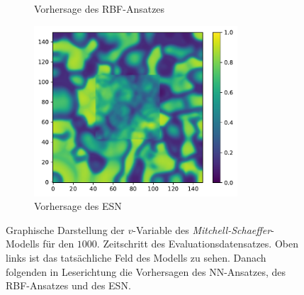 \begin{appendices}
\begin{figure}[h]
\begin{subfigure}{.5\textwidth}
		\setcapmargin[1cm]{0.5cm}
  		\caption{Vorhersage des \textsc{RBF}-Ansatzes}
	\end{subfigure}%
	\begin{subfigure}{.5\textwidth}
		\centering
		\includegraphics[height=2.5in]{figures/results/inner_cross_prediction/mitchell_v_inner_esn.pdf}
		\setcapmargin[1cm]{0.5cm}
  		\caption{Vorhersage des \textsc{ESN}}
	\end{subfigure}
	\caption{Graphische Darstellung der $v$-Variable des \textit{Mitchell-Schaeffer}-Modells für den $1000$. Zeitschritt des Evaluationsdatensatzes. Oben links ist das tatsächliche Feld des Modells zu sehen. Danach folgenden in Leserichtung die Vorhersagen des \textsc{NN}-Ansatzes, des \textsc{RBF}-Ansatzes und des \textsc{ESN}.}
	\label{fig:apx_inner_cross_mitchell_result}
\end{figure} 


\end{appendices}
